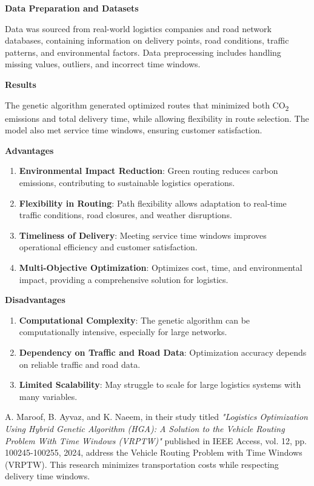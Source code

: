 \textbf{Data Preparation and Datasets}

Data was sourced from real-world logistics companies and road network databases, containing information on delivery points, road conditions, traffic patterns, and environmental factors. Data preprocessing includes handling missing values, outliers, and incorrect time windows.

\textbf{Results}

The genetic algorithm generated optimized routes that minimized both CO\textsubscript{2} emissions and total delivery time, while allowing flexibility in route selection. The model also met service time windows, ensuring customer satisfaction.

\textbf{Advantages}
\begin{enumerate}
    \item \textbf{Environmental Impact Reduction}: Green routing reduces carbon emissions, contributing to sustainable logistics operations.
    \item \textbf{Flexibility in Routing}: Path flexibility allows adaptation to real-time traffic conditions, road closures, and weather disruptions.
    \item \textbf{Timeliness of Delivery}: Meeting service time windows improves operational efficiency and customer satisfaction.
    \item \textbf{Multi-Objective Optimization}: Optimizes cost, time, and environmental impact, providing a comprehensive solution for logistics.
\end{enumerate}

\textbf{Disadvantages}
\begin{enumerate}
    \item \textbf{Computational Complexity}: The genetic algorithm can be computationally intensive, especially for large networks.
    \item \textbf{Dependency on Traffic and Road Data}: Optimization accuracy depends on reliable traffic and road data.
    \item \textbf{Limited Scalability}: May struggle to scale for large logistics systems with many variables.
\end{enumerate}

A. Maroof, B. Ayvaz, and K. Naeem, in their study titled \textit{"Logistics Optimization Using Hybrid Genetic Algorithm (HGA): A Solution to the Vehicle Routing Problem With Time Windows (VRPTW)"} published in IEEE Access, vol. 12, pp. 100245-100255, 2024, address the Vehicle Routing Problem with Time Windows (VRPTW). This research minimizes transportation costs while respecting delivery time windows.

